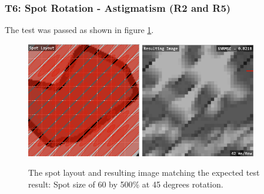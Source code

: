 \documentclass[12pt, titlepage]{article}
\begin{document}
\subsubsection{T6: Spot Rotation - Astigmatism (R2 and R5)}
The test was passed as shown in figure \ref{fig_t6}.
\begin{figure}[h!]
  \begin{center}
   \includegraphics[width=5cm]{t6a.png}
   \includegraphics[width=5cm]{t6b.png}
  \caption{The spot layout and resulting image matching the expected test result:
  Spot size of 60 by 500\% at 45 degrees rotation.}
  \label{fig_t6} 
  \end{center}
\end{figure}
\end{document}
